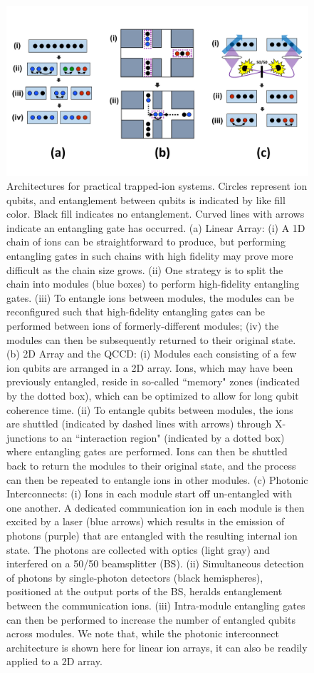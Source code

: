 \documentclass[%
reprint,
 amsmath,amssymb,
]{revtex4-1}
\begin{document}
\begin{figure}[t b h]
\includegraphics[width=2.0\columnwidth]{Architecture_LinearArray_v7.pdf}
\caption{Architectures for practical trapped-ion systems.  Circles represent ion qubits, and entanglement between qubits is indicated by like fill color.  Black fill indicates no entanglement.  Curved lines with arrows indicate an entangling gate has occurred.  (a) Linear Array: (i) A 1D chain of ions can be straightforward to produce, but performing entangling gates in such chains with high fidelity may prove more difficult as the chain size grows. (ii) One strategy is to split the chain into modules (blue boxes) to perform high-fidelity entangling gates. (iii) To entangle ions between modules, the modules can be reconfigured such that high-fidelity entangling gates can be performed between ions of formerly-different modules; (iv) the modules can then be subsequently returned to their original state.  (b) 2D Array and the QCCD: (i) Modules each consisting of a few ion qubits are arranged in a 2D array.  Ions, which may have been previously entangled, reside in so-called ``memory" zones (indicated by the dotted box), which can be optimized to allow for long qubit coherence time. (ii) To entangle qubits between modules, the ions are shuttled (indicated by dashed lines with arrows) through X-junctions to an ``interaction region" (indicated by a dotted box) where entangling gates are performed. Ions can then be shuttled back to return the modules to their original state, and the process can then be repeated to entangle ions in other modules.  (c) Photonic Interconnects: (i) Ions in each module start off un-entangled with one another.  A dedicated communication ion in each module is then excited by a laser (blue arrows) which results in the emission of photons (purple) that are entangled with the resulting internal ion state.  The photons are collected with optics (light gray) and interfered on a 50/50 beamsplitter (BS).  (ii) Simultaneous detection of photons by single-photon detectors (black hemispheres), positioned at the output ports of the BS, heralds entanglement between the communication ions. (iii) Intra-module entangling gates can then be performed to increase the number of entangled qubits across modules.  We note that, while the photonic interconnect architecture is shown here for linear ion arrays, it can also be readily applied to a 2D array.}
\label{fig:architectures}
\end{figure}
\end{document}
